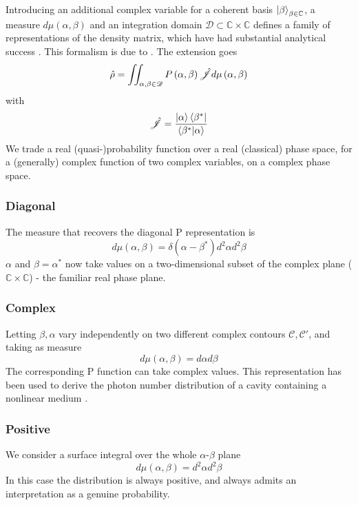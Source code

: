 Introducing an additional complex variable for a coherent basis {$\ket{\beta}_{\beta\in\mathbb{C}}$}, a measure $d\mu(\alpha, \beta)$ and an integration domain $\mathscr{D}\subset\mathbb{C}\times\mathbb{C}$ defines a family of representations of the density matrix, which have had substantial analytical success
 \cite{Drummond1979}.
This formalism is due to \cite{Drummond1980}.
The extension goes 
\begin{equation}
  \hat{\rho} = \iint_{\alpha, \beta \in \mathscr{D}}P \left( \alpha, \beta \right) \hat{\mathscr{J}} 
          d \mu \left( \alpha, \beta \right)
\end{equation}
with
\begin{equation}
  \hat{\mathscr{J}} = \frac{\ket{\alpha}\bra{\beta^*}}{\braket{\beta^*}{\alpha}} 
\end{equation}
We trade a real (quasi-)probability function over a real (classical) phase space, for a (generally) complex function of two complex variables, on a complex phase space.
\subsubsection{Diagonal} 
The measure that recovers the diagonal P representation is
\begin{equation}
  d\mu(\alpha, \beta) = \delta(\alpha-\beta^*)d^2 \alpha d^2 \beta
\end{equation}
$\alpha$ and $\beta = \alpha^*$ now take values on a two-dimensional subset of the complex plane ($\mathbb{C}\times\mathbb{C}$) - the familiar real phase plane.
\subsubsection{Complex}
Letting $\beta, \alpha$ vary independently on two different complex contours $\mathscr{C}, \mathscr{C}'$, and taking as measure
\begin{equation}
  d\mu\left(\alpha, \beta\right) = d\alpha d\beta
\end{equation}
The corresponding P function can take complex values.
This representation has been used to derive the photon number distribution of a cavity containing a nonlinear medium \cite{Drummond1979}.
\subsubsection{Positive}
We consider a surface integral over the whole $\alpha$-$\beta$ plane
\begin{equation}
  d \mu(\alpha, \beta) = d^2 \alpha d^2 \beta
\end{equation}
In this case the distribution is always positive, and always admits an interpretation as a genuine probability. 
